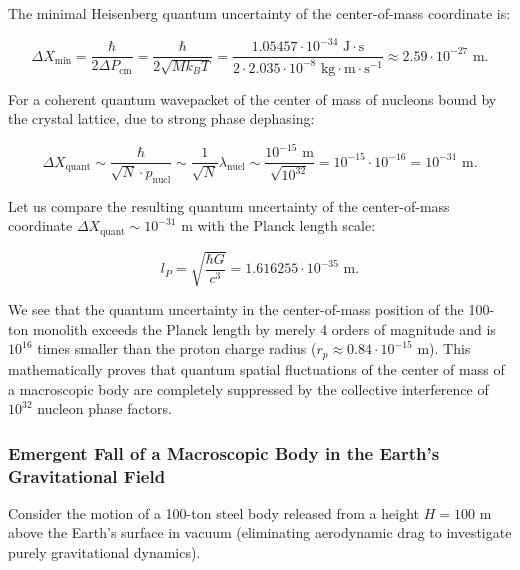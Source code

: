 The minimal Heisenberg quantum uncertainty of the center-of-mass coordinate is:

\begin{equation}\label{eq:5.18}\tag{5.18}
\Delta X_{\text{min}} = \frac{\hbar}{2 \Delta P_{\text{cm}}} = \frac{\hbar}{2 \sqrt{M k_B T}} = \frac{1.05457 \cdot 10^{-34}\text{ J}\cdot\text{s}}{2 \cdot 2.035 \cdot 10^{-8}\text{ kg}\cdot\text{m}\cdot\text{s}^{-1}} \approx 2.59 \cdot 10^{-27}\text{ m}.
\end{equation}

For a coherent quantum wavepacket of the center of mass of nucleons bound by the crystal lattice, due to strong phase dephasing:

\begin{equation}\label{eq:5.19}\tag{5.19}
\Delta X_{\text{quant}} \sim \frac{\hbar}{\sqrt{N} \cdot p_{\text{nucl}}} \sim \frac{1}{\sqrt{N}} \lambda_{\text{nucl}} \sim \frac{10^{-15}\text{ m}}{\sqrt{10^{32}}} = 10^{-15} \cdot 10^{-16} = 10^{-31}\text{ m}.
\end{equation}

Let us compare the resulting quantum uncertainty of the center-of-mass coordinate $\Delta X_{\text{quant}} \sim 10^{-31}\text{ m}$ with the Planck length scale:

\begin{equation}\label{eq:5.20}\tag{5.20}
l_P = \sqrt{\frac{\hbar G}{c^3}} = 1.616255 \cdot 10^{-35}\text{ m}.
\end{equation}

We see that the quantum uncertainty in the center-of-mass position of the 100-ton monolith exceeds the Planck length by merely 4 orders of magnitude and is $10^{16}$ times smaller than the proton charge radius ($r_p \approx 0.84 \cdot 10^{-15}\text{ m}$). This mathematically proves that quantum spatial fluctuations of the center of mass of a macroscopic body are completely suppressed by the collective interference of $10^{32}$ nucleon phase factors.

\subsubsection{Emergent Fall of a Macroscopic Body in the Earth's Gravitational Field}\label{sec:5.1.5}

Consider the motion of a 100-ton steel body released from a height $H = 100\text{ m}$ above the Earth's surface in vacuum (eliminating aerodynamic drag to investigate purely gravitational dynamics).

